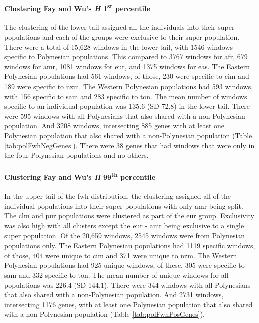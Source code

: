 \documentclass[]{report}
\let\oldparagraph\paragraph
\renewcommand{\paragraph}[1]{\oldparagraph{#1}\mbox{}}
\begin{document}
\paragraph{\texorpdfstring{Clustering Fay and Wu's \emph{H}
1\textsuperscript{st}
percentile}{Clustering Fay and Wu's H 1st percentile}}\label{clustering-fay-and-wus-h-1st-percentile}

The clustering of the lower tail assigned all the individuals into their
super populations and each of the groups were exclusive to their super
population. There were a total of 15,628 windows in the lower tail, with
1546 windows specific to Polynesian populations. This compared to 3767
windows for \gls{afr}, 679 windows for \gls{amr}, 1081 windows for
\gls{eur}, and 1375 windows for \gls{eas}. The Eastern Polynesian
populations had 561 windows, of those, 230 were specific to \gls{cim}
and 189 were specific to \gls{nzm}. The Western Polynesian populations
had 593 windows, with 156 specific to \gls{sam} and 283 specific to
\gls{ton}. The mean number of windows specific to an individual
population was 135.6 (SD 72.8) in the lower tail. There were 595 windows
with all Polynesians that also shared with a non-Polynesian population.
And 3208 windows, intersecting 885 genes with at least one Polynesian
population that also shared with a non-Polynesian population (Table
\ref{tab:polFwhNegGenes}). There were 38 genes that had windows that
were only in the four Polynesian populations and no others.

\paragraph{\texorpdfstring{Clustering Fay and Wu's \emph{H}
99\textsuperscript{th}
percentile}{Clustering Fay and Wu's H 99th percentile}}\label{clustering-fay-and-wus-h-99th-percentile}

In the upper tail of the \gls{fwh} distribution, the clustering assigned
all of the individual populations into their super populations with only
\gls{amr} being split. The \gls{clm} and \gls{pur} populations were
clustered as part of the \gls{eur} group. Exclusivity was also high with
all clusters except the \gls{eur} - \gls{amr} being exclusive to a
single super population. Of the 20,659 windows, 2545 windows were from
Polynesian populations only. The Eastern Polynesian populations had 1119
specific windows, of those, 404 were unique to \gls{cim} and 371 were
unique to \gls{nzm}. The Western Polynesian populations had 925 unique
windows, of these, 305 were specific to \gls{sam} and 332 specific to
\gls{ton}. The mean number of unique windows for all populations was
226.4 (SD 144.1). There were 344 windows with all Polynesians that also
shared with a non-Polynesian population. And 2731 windows, intersecting
1176 genes, with at least one Polynesian population that also shared
with a non-Polynesian population (Table \ref{tab:polFwhPosGenes}).
\end{document}
